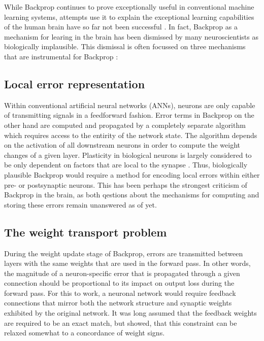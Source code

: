 While Backprop continues to prove exceptionally useful in conventional machine learning systems, attempts use it to
explain the exceptional learning capabilities of the human brain have so far not been successful \phrasing. In fact,
Backprop as a mechanism for learing in the brain has been dismissed by many neuroscientists as biologically
implausible\cite{Crick1989,Grossberg1987}. This dismissal is often focussed on three mechanisms that are instrumental
for Backprop \citep{whittington2019theories,Bengio2015}:



\subsection{Local error representation}

Within conventional artificial neural networks (ANNs), neurons are only capable of transmitting signals in a feedforward
fashion. Error terms in Backprop on the other hand are computed and propagated by a completely separate algorithm which
requires access to the entirity of the network state. The algorithm depends on the activation of all downstream neurons
in order to compute the weight changes of a given layer. Plasticity in biological neurons is largely considered to be
only dependent on factors that are local to the synapse \citep{Abbott2000,magee2020synaptic,urbanczik2014learning}.
Thus, biologically plausible Backprop would require a method for encoding local errors within either pre- or
postsynaptic neurons. This has been perhaps the strongest criticism of Backprop in the brain, as both qestions about the
mechanisms for computing and storing these errors remain unanswered as of yet.

\subsection{The weight transport problem}

During the weight update stage of Backprop, errors are transmitted between layers with the same weights that are used in
the forward pass. In other words, the magnitude of a neuron-specific error that is propagated through a given connection
should be proportional to its impact on output loss during the forward pass. For this to work, a neuronal network would
require feedback connections that mirror both the network structure and synaptic weights exhibited by the original
network. It was long assumed that the feedback weights are required to be an exact match, but \cite{Liao2016} showed,
that this constraint can be relaxed somewhat to a concordance of weight signs.

